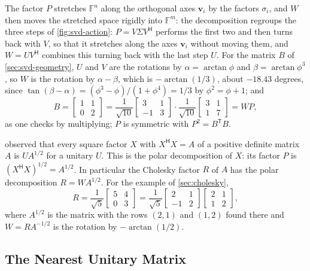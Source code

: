 The factor $P$ stretches $\mathbb F^n$ along the orthogonal axes $\mathbf v_i$ by the factors $\sigma_i$, and $W$ then moves the stretched space rigidly into $\mathbb F^m$: the decomposition regroups the three steps of \cref{fig:svd-action}: $P=V\Sigma V^{\mathsf H}$ performs the first two and then turns back with $V$, so that it stretches along the axes $\mathbf v_i$ without moving them, and $W=UV^{\mathsf H}$ combines this turning back with the last step $U$. For the matrix $B$ of \cref{sec:svd-geometry}, $U$ and $V$ are the rotations by $\alpha=\arctan\phi$ and $\beta=\arctan\phi^3$, so $W$ is the rotation by $\alpha-\beta$, which is $-\arctan(1/3)$, about $-18.43$ degrees, since $\tan(\beta-\alpha)=(\phi^3-\phi)/(1+\phi^4)=1/3$ by $\phi^2=\phi+1$; and
\[
B=\begin{bmatrix}1&1\\0&2\end{bmatrix}=\frac1{\sqrt{10}}\begin{bmatrix}3&1\\-1&3\end{bmatrix}\cdot\frac1{\sqrt{10}}\begin{bmatrix}3&1\\1&7\end{bmatrix}=WP ,
\]
as one checks by multiplying; $P$ is symmetric with $P^2=B^{\mathsf T}B$.

 observed that every square factor $X$ with $X^{\mathsf H}X=A$ of a positive definite matrix $A$ is $UA^{1/2}$ for a unitary $U$. This is the polar decomposition of $X$: its factor $P$ is $(X^{\mathsf H}X)^{1/2}=A^{1/2}$. In particular the Cholesky factor $R$ of $A$ has the polar decomposition $R=WA^{1/2}$. For the example of \cref{sec:cholesky},
\[
R=\frac1{\sqrt5}\begin{bmatrix}5&4\\0&3\end{bmatrix}=\frac1{\sqrt5}\begin{bmatrix}2&1\\-1&2\end{bmatrix}\begin{bmatrix}2&1\\1&2\end{bmatrix},
\]
where $A^{1/2}$ is the matrix with the rows $(2,1)$ and $(1,2)$ found there and $W=RA^{-1/2}$ is the rotation by $-\arctan(1/2)$.

\subsection{The Nearest Unitary Matrix}

